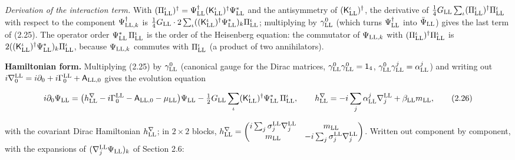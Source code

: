 \documentclass[
  10pt,
]{article}
\begin{document}
\emph{Derivation of the interaction term.} With
\((\Pi^\iota_{\rm LL})^\dagger=\Psi^\dagger_{\rm LL}(\mathsf K^\iota_{\rm LL})^\dagger\Psi^*_{\rm LL}\)
and the antisymmetry of \((\mathsf K^\iota_{\rm LL})^\dagger\), the
derivative of
\(\tfrac14G_{\rm LL}\sum_\iota(\Pi^\iota_{\rm LL})^\dagger\Pi^\iota_{\rm LL}\)
with respect to the component \(\Psi^\dagger_{{\rm LL},k}\) is
\(\tfrac14G_{\rm LL}\cdot2\sum_\iota((\mathsf K^\iota_{\rm LL})^\dagger\Psi^*_{\rm LL})_k\Pi^\iota_{\rm LL}\);
multiplying by \(\gamma^0_{\rm LL}\) (which turns
\(\Psi^\dagger_{\rm LL}\) into \(\bar\Psi_{\rm LL}\)) gives the last
term of (2.25). The operator order
\(\Psi^*_{\rm LL}\,\Pi^\iota_{\rm LL}\) is the order of the Heisenberg
equation: the commutator of \(\Psi_{{\rm LL},k}\) with
\((\Pi^\iota_{\rm LL})^\dagger\Pi^\iota_{\rm LL}\) is
\(2((\mathsf K^\iota_{\rm LL})^\dagger\Psi^*_{\rm LL})_k\Pi^\iota_{\rm LL}\),
because \(\Psi_{{\rm LL},k}\) commutes with \(\Pi^\iota_{\rm LL}\) (a
product of two annihilators).

\textbf{Hamiltonian form.} Multiplying (2.25) by \(\gamma^0_{\rm LL}\)
(canonical gauge for the Dirac matrices,
\(\gamma^0_{\rm LL}\gamma^0_{\rm LL}=\mathsf 1_4\),
\(\gamma^0_{\rm LL}\gamma^j_{\rm LL}=\alpha^j_{\rm LL}\)) and writing
out
\(i\nabla^{\rm LL}_0=i\partial_0+i\Gamma^{\rm LL}_0+\mathsf A_{{\rm LL},0}\)
gives the evolution equation

\[i\partial_0\Psi_{\rm LL}=\big(h^\nabla_{\rm LL}-i\Gamma^{\rm LL}_0-\mathsf A_{{\rm LL},0}-\mu_{\rm LL}\big)\Psi_{\rm LL}-\tfrac12G_{\rm LL}\sum_\iota(\mathsf K^\iota_{\rm LL})^\dagger\Psi^*_{\rm LL}\,\Pi^\iota_{\rm LL},\qquad h^\nabla_{\rm LL}=-i\sum_j\alpha^j_{\rm LL}\nabla^{\rm LL}_j+\beta_{\rm LL}m_{\rm LL},\tag{2.26}\]

with the covariant Dirac Hamiltonian \(h^\nabla_{\rm LL}\); in
\(2\times2\) blocks,
\(h^\nabla_{\rm LL}=\begin{pmatrix}i\sum_j\sigma^{\rm LL}_j\nabla^{\rm LL}_j&m_{\rm LL}\\m_{\rm LL}&-i\sum_j\sigma^{\rm LL}_j\nabla^{\rm LL}_j\end{pmatrix}\).
Written out component by component, with the expansions of
\((\nabla^{\rm LL}_j\Psi_{\rm LL})_k\) of Section 2.6:
\end{document}
